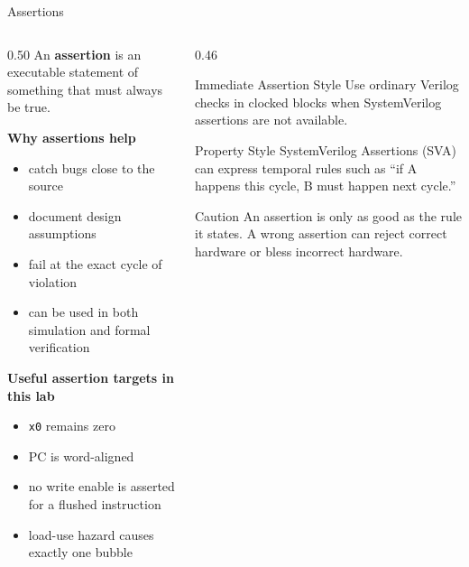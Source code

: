 \documentclass[aspectratio=169,10pt]{beamer}
\begin{document}
\begin{frame}{Assertions}
  \begin{columns}[T]
    \begin{column}{0.50\textwidth}
      An \textbf{assertion} is an executable statement of something that must always be true.

      \vspace{0.7em}
      \textbf{Why assertions help}
      \begin{itemize}
        \item catch bugs close to the source
        \item document design assumptions
        \item fail at the exact cycle of violation
        \item can be used in both simulation and formal verification
      \end{itemize}

      \vspace{0.7em}
      \textbf{Useful assertion targets in this lab}
      \begin{itemize}
        \item \texttt{x0} remains zero
        \item PC is word-aligned
        \item no write enable is asserted for a flushed instruction
        \item load-use hazard causes exactly one bubble
      \end{itemize}
    \end{column}
    \begin{column}{0.46\textwidth}
      \begin{block}{Immediate Assertion Style}
        Use ordinary Verilog checks in clocked blocks when SystemVerilog assertions are not available.
      \end{block}

      \vspace{0.6em}
      \begin{block}{Property Style}
        SystemVerilog Assertions (SVA) can express temporal rules such as ``if A happens this cycle, B must happen next cycle.''
      \end{block}

      \vspace{0.6em}
      \begin{alertblock}{Caution}
        An assertion is only as good as the rule it states. A wrong assertion can reject correct hardware or bless incorrect hardware.
      \end{alertblock}
    \end{column}
  \end{columns}
\end{frame}
\end{document}
